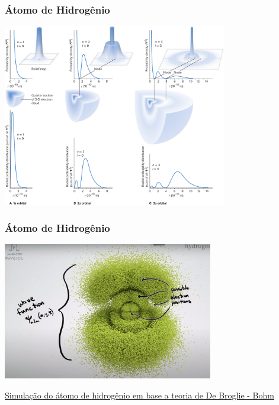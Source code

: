 \documentclass[12pt,brazil,table]{beamer}
\begin{document}
  


\begin{frame} 
  \frametitle{Átomo de Hidrogênio}
  
  
      \begin{center}
        \includegraphics[height=8cm]{figuras/fig44}
      \end{center}
    
\end{frame}




\begin{frame} 
  \frametitle{Átomo de Hidrogênio}
  \fontsize{10pt}{11pt}\selectfont
  
  
      \begin{center}
        \includegraphics[height=6cm]{figuras/fig45}
      \end{center}
      
      \href{https://www.youtube.com/watch?v=W2Xb2GFK2yc}{\color{blue} Simulação do átomo de hidrogênio em base a teoria de De Broglie - Bohm}
    
\end{frame}
\end{document}
